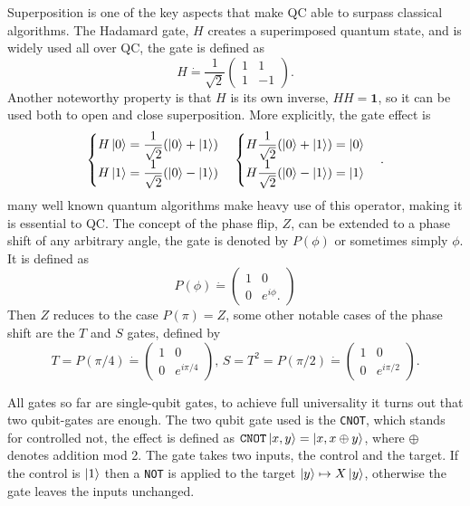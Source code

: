 Superposition is one of the key aspects that make QC able to surpass classical algorithms. The Hadamard gate, $H$ creates a superimposed quantum state, and is widely used all over QC, the gate is defined as
\begin{equation}
H \dot{=} \dfrac{1}{\sqrt{2}}\begin{pmatrix}
1 & 1 \\ 1 & -1
\end{pmatrix}.
\end{equation}
Another noteworthy property is that $H$ is its own inverse, $HH = \mathbf{1}$, so it can be used both to open and close superposition. More explicitly, the gate effect is 
\begin{equation}
\begin{cases}
H\ket{0} = \dfrac{1}{\sqrt{2}}(\ket{0} + \ket{1})
\\
H\ket{1} = \dfrac{1}{\sqrt{2}}(\ket{0} - \ket{1})
\end{cases}
\begin{cases}
H\dfrac{1}{\sqrt{2}}(\ket{0} + \ket{1}) = \ket{0}
\\
H\dfrac{1}{\sqrt{2}}(\ket{0} - \ket{1}) = \ket{1}
\end{cases}.
\end{equation}
many well known quantum algorithms make heavy use of this operator\cite{Grover,shor}, making it is essential to QC.
The concept of the phase flip, $Z$, can be extended to a phase shift of any arbitrary angle, the gate is denoted by $P(\phi)$ or sometimes simply $\phi$. It is defined as 
\begin{equation}
P(\phi) \dot{=} \begin{pmatrix}
1 & 0 \\
0 & e^{i\phi}.
\end{pmatrix}
\end{equation}
Then $Z$ reduces to the case $P(\pi) = Z$, some other notable cases of the phase shift are the $T$ and $S$ gates, defined by
\begin{equation}
T = P({\pi/4}) \dot{=} \begin{pmatrix}
1 & 0 \\ 0 & e^{i\pi/4}
\end{pmatrix},\, S = T^2 = P({\pi/2}) \dot{=} \begin{pmatrix}
1 & 0 \\ 0 & e^{i\pi/2}
\end{pmatrix}.
\end{equation}

All gates so far are single-qubit gates, to achieve full universality it turns out that two qubit-gates are enough. The two qubit gate used is the {\tt CNOT}, which stands for controlled not, the effect is defined as ${\tt CNOT}\ket{x,y} = \ket{x,x\oplus y}$, where $\oplus$ denotes addition mod 2. The gate takes two inputs, the control and the target. If the control is $\ket{1}$ then a {\tt NOT} is applied to the target $\ket{y} \mapsto X\ket{y}$, otherwise the gate leaves the inputs unchanged.



